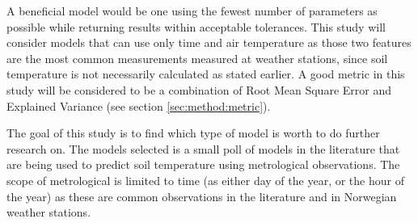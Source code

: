 A beneficial model would be one using the fewest number of parameters as possible while returning results within acceptable tolerances. This study will consider models that can use only time and air temperature as those two features are the most common measurements measured at weather stations, since soil temperature is not necessarily calculated as stated earlier. A good metric in this study will be considered to be a combination of Root Mean Square Error and Explained Variance (see section \ref{sec:method:metric}). 

The goal of this study is to find which type of model is worth to do further research on. The models selected is a small poll of models in the literature that are being used to predict soil temperature using metrological observations. The scope of metrological is limited to time (as either day of the year, or the hour of the year) as these are common observations in the literature and in Norwegian weather stations. 

